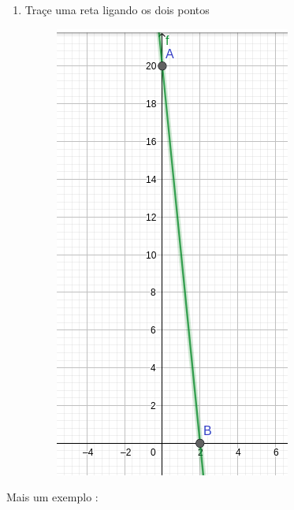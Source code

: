 \begin{multicols*}{2}
\begin{enumerate}[wide, labelwidth=!, labelindent=0pt]
        \item Traçe uma reta ligando os dois pontos
              \begin{figure}[H]
                  \centering
                  \includegraphics[scale=0.3]{assets/rafael/img13.png}
              \end{figure}
    \end{enumerate}

    Mais um exemplo :


\end{multicols*}
